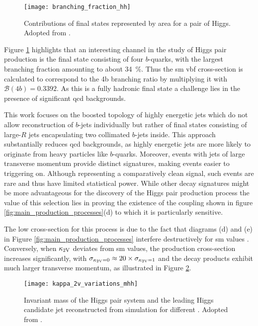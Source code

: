 \begin{figure}
    \centering
    \texttt{[image: branching\_fraction\_hh]}
    \caption[]{Contributions of final states represented by area for a pair of Higgs. Adopted from \citep{ATL-COM-PHYS-2020-083}.}
    \label{fig:branching_fraction_hh}
\end{figure}
Figure \ref{fig:branching_fraction_hh} highlights that an interesting channel in the study of Higgs pair production is the final state consisting of four $b$-quarks, with the largest branching fraction amounting to about \qty[]{34}{\percent}. Thus the \ac{sm} \ac{vbf} cross-section is calculated to correspond to the 4b branching ratio by multiplying it with $\mathcal{B}(4b)=0.3392$. As this is a fully hadronic final state a challenge lies in the presence of significant \ac{qcd} backgrounds.

This work focuses on the boosted topology of highly energetic jets which do not allow reconstruction of $b$-jets individually but rather of final states consisting of large-$R$ jets encapsulating two collimated $b$-jets inside. This approach substantially reduces \ac{qcd} backgrounds, as highly energetic jets are more likely to originate from heavy particles like $b$-quarks. Moreover, events with jets of large transverse momentum provide distinct signatures, making events easier to triggering on. Although representing a comparatively clean signal, such events are rare and thus have limited statistical power. While other decay signatures might be more advantageous for the discovery of the Higgs pair production process the value of this selection lies in proving the existence of the \ktwov coupling shown in figure \ref{fig:main_production_processes}(d) to which it is particularly sensitive.

The low cross-section for this process is due to the fact that diagrams (d) and (e) in Figure \ref{fig:main_production_processes} interfere destructively for \ac{sm} values \citep{bishara2017higgs}. Conversely, when $\kappa_{\text{2V}}$ deviates from \ac{sm} values, the production cross-section increases significantly, with $\sigma_{\kappa_{\text{2V}}=0}\approx 20\times \sigma_{\kappa_{\text{2V}}=1}$ and the decay products exhibit much larger transverse momentum, as illustrated in Figure \ref{fig:kappa_2v_variations_mhh}.
\begin{figure}
    \centering
    \texttt{[image: kappa\_2v\_variations\_mhh]}
    \caption[]{Invariant mass of the Higgs pair system and the leading Higgs candidate jet \pt  reconstructed from simulation for different \ktwov. Adopted from \citep{ATL-PHYS-PUB-2019-007}.}
    \label{fig:kappa_2v_variations_mhh}
\end{figure}

